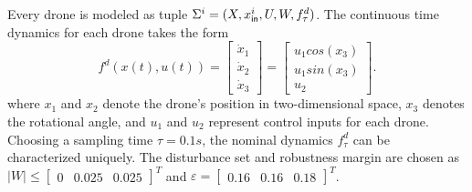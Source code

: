 Every drone is modeled as tuple $\Sigma^i=(X,x_{\mathsf{in}}^i,U,W,f^d_\tau)$. %
The continuous time dynamics for each drone takes the form
\begin{equation*}\label{eq:unicycle_ss}
	f^{d}(x(t),u(t))=
	\begin{bmatrix}
		\dot{x}_1\\
		\dot{x}_2\\
		\dot{x}_3
	\end{bmatrix}=
	\begin{bmatrix}
		u_1cos(x_3)\\
		u_1sin(x_3)\\
		u_2
	\end{bmatrix}.
\end{equation*}
where $x_1$ and $x_2$ denote the drone's position in two-dimensional space, $x_3$ denotes the rotational angle, and $u_1$ and $u_2$ represent control inputs for each drone. Choosing a sampling time $\tau=0.1s$, the nominal dynamics $f^d_\tau$ can be characterized uniquely. The disturbance set and robustness margin are chosen as $|W|\leq \begin{bmatrix}0&0.025&0.025\end{bmatrix}^T$ and $\varepsilon=\begin{bmatrix}0.16&0.16&0.18\end{bmatrix}^T$.



